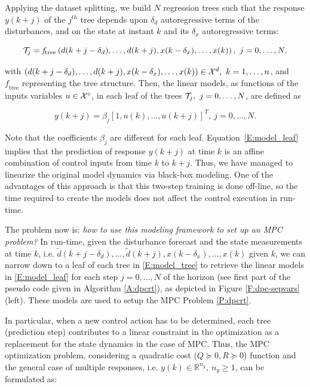 \textcolor[rgb]{0,0,1}{Applying the dataset splitting, we build $N$ regression trees such that the response $y(k+j)$ of the $j^{th}$ tree depends upon $\delta_d$ autoregressive terms of the disturbances, and on the state at instant $k$ and its $\delta_x$ autoregressive terms:}

\textcolor[rgb]{0,0,1}{\begin{equation}\label{E:model_tree}
\T_j = \mathit{f}_{\mathrm{tree}} \left( d(k+j-\delta_d),\ldots,d(k+j),x(k-\delta_x),\ldots,x(k)  \right),\ j=0,\ldots,N,
\end{equation}}

\noindent \textcolor[rgb]{0,0,1}{with $\left( d(k+j-\delta_d),\ldots,d(k+j),x(k-\delta_x),\ldots,x(k)  \right)\in\X^d,\ k=1,\ldots,n$, and $\mathit{f}_{\mathrm{tree}}$ representing the tree structure.
Then, the linear models, as functions of the inputs variables $u\in\mathcal{X}^c$, in each leaf of the trees $\T_j,\ j=0,\ldots,N$, are defined as}

\textcolor[rgb]{0,0,1}{\begin{equation}\label{E:model_leaf}
y(k+j) =  \beta_j [1,u(k),\ldots,u(k+j) ]^T,\ j=0,\ldots,N.
\end{equation}}

\noindent \textcolor[rgb]{0,0,1}{Note that the coefficients $\beta_j$ are different for each leaf.
Equation~\eqref{E:model_leaf} implies that the prediction of response $y(k+j)$ at time $k$ is an affine combination of control inputs from time $k$ to $k+j$.
Thus, we have managed to linearize the original model dynamics via black-box modeling.
One of the advantages of this approach is that this two-step training is done off-line, so the time required to create the models does not affect the control execution in run-time.}

\textcolor[rgb]{0,0,1}{The problem now is: \emph{how to use this modeling framework to set up an MPC problem?} In run-time, given the disturbance forecast and the state measurements at time $k$, i.e. $\tilde d(k+j-\delta_d),\ldots,\tilde d(k+j),x(k-\delta_x),\ldots,x(k)$ given $k$, we can narrow down to a leaf of each tree in \eqref{E:model_tree} to retrieve the linear models in \eqref{E:model_leaf} for each step $j=0,\ldots,N$ of the horizon (see first part of the pseudo code given in Algorithm \ref{A:dpcrt}), as depicted in Figure \ref{F:dpc-sepvars} (left). These models are used to setup the MPC Problem \ref{P:dpcrt}.}

\textcolor[rgb]{0,0,1}{In particular, }when a new control action has to be determined, each tree (prediction step) contributes to a linear constraint in the optimization as a replacement for the state dynamics in the case of MPC. Thus, the MPC optimization problem, considering a quadratic cost ($Q \succeq 0, R \succeq 0$) function and the general case of multiple responses, i.e. $y(k)\in\mathbb{R}^{n_y},\ n_y\geq 1$, can be formulated as:

